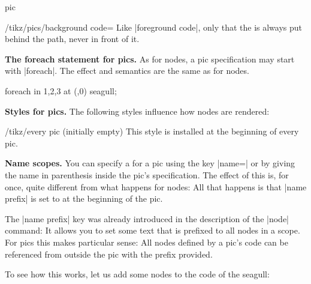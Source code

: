 \begin{pathoperation}{pic}
  \begin{key}{/tikz/pics/background code=}
    Like |foreground code|, only that the  is always put
    behind the path, never in front of it.
  \end{key}
  
  \medskip
  \textbf{The foreach statement for pics.}
  As for nodes, a pic specification may start with |foreach|. The
  effect and semantics are the same as for nodes.
\begin{codeexample}[]
\tikz \pic foreach \x in {1,2,3} at (\x,0) {seagull};
\end{codeexample}

  \medskip
  \textbf{Styles for pics.}
  The following styles influence how nodes are rendered:
  \begin{stylekey}{/tikz/every pic (initially \normalfont empty)}
    This style is installed at the beginning of every pic.
\begin{codeexample}[]
\end{codeexample}
  \end{stylekey}

  
  \medskip
  \textbf{Name scopes.}
  You can specify a  for a pic using the key
  |name=| or by giving the name in parenthesis inside the
  pic's specification. The effect of this is, for once, quite
  different from what happens for nodes: All that happens is that
  |name prefix| is set to  at the beginning of the pic.
  
  The |name prefix| key was already introduced in the description of
  the |node| command: It allows you to set some text that is prefixed
  to all nodes in a scope. For pics this makes particular sense: All
  nodes defined by a pic's code can be referenced from outside the pic
  with the prefix provided.

  To see how this works, let us add some nodes to the code of the
  seagull:
\begin{codeexample}
\end{codeexample}
\end{pathoperation}
